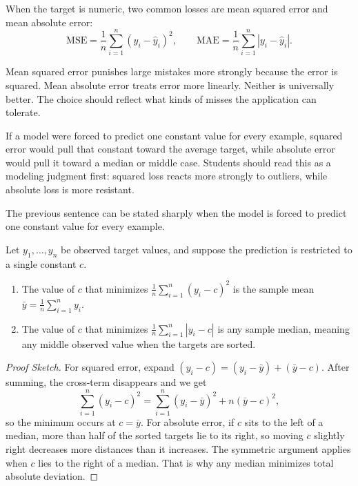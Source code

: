 When the target is numeric, two common losses are mean squared error and mean absolute error:
\[
\text{MSE} = \frac{1}{n}\sum_{i=1}^{n}(y_i - \hat{y}_i)^2,
\qquad
\text{MAE} = \frac{1}{n}\sum_{i=1}^{n}|y_i - \hat{y}_i|.
\]

Mean squared error punishes large mistakes more strongly because the error is squared. Mean absolute error treats error more linearly. Neither is universally better. The choice should reflect what kinds of misses the application can tolerate.

\begin{practicalnote}
If a model were forced to predict one constant value for every example, squared error would pull that constant toward the average target, while absolute error would pull it toward a median or middle case. Students should read this as a modeling judgment first: squared loss reacts more strongly to outliers, while absolute loss is more resistant.
\end{practicalnote}

\begin{mathlens}
The previous sentence can be stated sharply when the model is forced to predict one constant value for every example.

\begin{theorem}
Let $y_1,\ldots,y_n$ be observed target values, and suppose the prediction is restricted to a single constant $c$.
\begin{enumerate}[leftmargin=*,label=\arabic*.]
\item The value of $c$ that minimizes $\frac{1}{n}\sum_{i=1}^{n}(y_i-c)^2$ is the sample mean $\bar{y}=\frac{1}{n}\sum_{i=1}^{n} y_i$.
\item The value of $c$ that minimizes $\frac{1}{n}\sum_{i=1}^{n}|y_i-c|$ is any sample median, meaning any middle observed value when the targets are sorted.
\end{enumerate}
\end{theorem}

\begin{proof}[Proof Sketch]
For squared error, expand $(y_i-c) = (y_i-\bar{y}) + (\bar{y}-c)$. After summing, the cross-term disappears and we get
\[
\sum_{i=1}^{n}(y_i-c)^2 = \sum_{i=1}^{n}(y_i-\bar{y})^2 + n(\bar{y}-c)^2,
\]
so the minimum occurs at $c=\bar{y}$. For absolute error, if $c$ sits to the left of a median, more than half of the sorted targets lie to its right, so moving $c$ slightly right decreases more distances than it increases. The symmetric argument applies when $c$ lies to the right of a median. That is why any median minimizes total absolute deviation.
\end{proof}
\end{mathlens}

